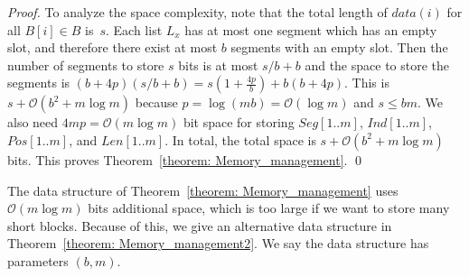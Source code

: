 \documentclass{llncs}
\newcommand{\Order}{\mathcal{O}}
\begin{document}
\begin{proof}
\medskip

To analyze the space complexity, note that the total length of $data(i)$ for
all $B[i] \in B$ is~$s$.
Each list $L_x$ has at most one segment which has an empty slot, and therefore
there exist at most $b$ segments with an empty slot.
Then the number of segments to store $s$ bits is at most $s/b+b$ and
the space to store the segments is 
$(b+4p)(s/b+b) = s(1+\frac{4p}{b}) + b(b+4p)$.
This is $s + \Order(b^2 + m \log m)$ because $p = \log(mb) = \Order(\log m)$
and $s \le bm$.
We also need $4mp = \Order(m \log m)$ bit space 
for storing $Seg[1..m]$, $Ind[1..m]$, $Pos[1..m]$, and $Len[1..m]$.
In total, the total space is
$s + \Order(b^2 + m \log m)$ bits.
This proves Theorem~\ref{theorem: Memory_management}.
\qed
\end{proof}

The data structure of Theorem~\ref{theorem: Memory_management} uses
$\Order(m \log m)$ bits additional space, which is too large if we want
to store many short blocks.
Because of this, we give an alternative data structure in
Theorem~\ref{theorem: Memory_management2}.
We say the data structure has parameters $(b, m)$.
\end{document}
